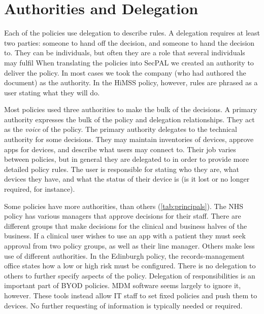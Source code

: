 \documentclass[conference,twocolumn]{IEEEtran}
\begin{document}
\section{Authorities and Delegation}

Each of the policies use delegation to describe rules.
A delegation requires at least two parties: someone to hand off the decision, and someone to hand the decision to.
They can be individuals, but often they are a role that several individuals may fulfil
When translating the policies into SecPAL we created an authority to deliver the policy.
In most cases we took the company (who had authored the document) as the authority.
In the HiMSS policy, however, rules are phrased as a user stating what they will do.

Most policies used three authorities to make the bulk of the decisions.
A primary authority expresses the bulk of the policy and delegation relationships.
They act as the \emph{voice} of the policy.
The primary authority delegates to the technical authority for some decisions.
They may maintain inventories of devices, approve apps for devices, and describe what users may connect to.
Their job varies between policies, but in general they are delegated to in order to provide more detailed policy rules.
The user is responsible for stating who they are, what devices they have, and what the status of their device is (is it lost or no longer required, for instance).

Some policies have more authorities, than others (\autoref{tab:principals}).
The NHS policy has various managers that approve decisions for their staff.
There are different groups that make decisions for the clinical and business halves of the business.
If a clinical user wishes to use an app with a patient they must seek approval from two policy groups, as well as their line manager.
Others make less use of different authorities.
In the Edinburgh policy, the records-management office states how a low or high risk must be configured.
There is no delegation to others to further specify aspects of the policy.
Delegation of responsibilities is an important part of BYOD policies.
MDM software seems largely to ignore it, however.
These tools instead allow IT staff to set fixed policies and push them to devices.
No further requesting of information is typically needed or required.
\end{document}
